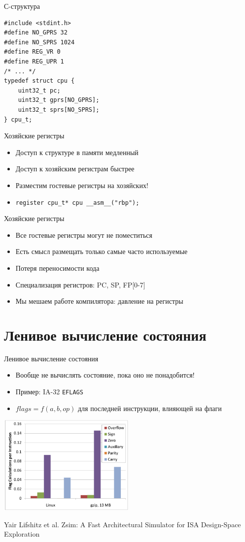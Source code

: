 \documentclass{beamer}
\begin{document}
\begin{frame}[fragile]{С-структура}
\begin{verbatim}
#include <stdint.h>
#define NO_GPRS 32
#define NO_SPRS 1024
#define REG_VR 0
#define REG_UPR 1
/* ... */
typedef struct cpu {
    uint32_t pc;
    uint32_t gprs[NO_GPRS];
    uint32_t sprs[NO_SPRS];
} cpu_t;
\end{verbatim}

\end{frame}

\begin{frame}{Хозяйские регистры}
\begin{itemize}
\item Доступ к структуре в памяти медленный
\item Доступ к хозяйским регистрам быстрее
\item Разместим гостевые регистры на хозяйских!
\item \texttt{register cpu_t* cpu __asm__("rbp");}
\end{itemize}
\end{frame}

\begin{frame}[fragile]{Хозяйские регистры}
\begin{itemize}
\item Все гостевые регистры могут не поместиться
\item Есть смысл размещать только самые часто используемые
\item Потеря переносимости кода
\item Специализация регистров: PC, SP, FP[0-7]
\item Мы мешаем работе компилятора: давление на регистры
\end{itemize}
\end{frame}

\section{Ленивое вычисление состояния}
\begin{frame}{Ленивое вычисление состояния}
\begin{itemize}
\item Вообще не вычислять состояние, пока оно не понадобится!
\item Пример: IA-32 \texttt{EFLAGS}
\item $flags = f(a, b, op)$ для последней инструкции, влияющей на флаги
\end{itemize}

\centering
\includegraphics[width=0.5\textwidth]{lazy-eflags}

\tiny{Yair Lifshitz et al. Zsim: A Fast Architectural Simulator for ISA Design-Space Exploration}
\end{frame}
\end{document}
